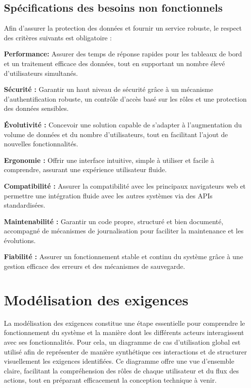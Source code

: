 \subsection{Spécifications des besoins non fonctionnels}

Afin d’assurer la protection des données et fournir un service robuste, le respect des critères suivants est obligatoire :

\noindent\textbf{Performance:} Assurer des temps de réponse rapides pour les tableaux de bord et un traitement efficace des données, tout en supportant un nombre élevé d’utilisateurs simultanés.
\vspace{0.3cm}

\noindent\textbf{Sécurité :} Garantir un haut niveau de sécurité grâce à un mécanisme d’authentification robuste, un contrôle d’accès basé sur les rôles et une protection des données sensibles.

\vspace{0.3cm}
\noindent\textbf{Évolutivité :} Concevoir une solution capable de s’adapter à l’augmentation du volume de données et du nombre d’utilisateurs, tout en facilitant l’ajout de nouvelles fonctionnalités.

\vspace{0.3cm}
\noindent\textbf{Ergonomie :} Offrir une interface intuitive, simple à utiliser et facile à comprendre, assurant une expérience utilisateur fluide.

\vspace{0.3cm}
\noindent\textbf{Compatibilité :} Assurer la compatibilité avec les principaux navigateurs web et permettre une intégration fluide avec les autres systèmes via des APIs standardisées.

\vspace{0.3cm}
\noindent\textbf{Maintenabilité :} Garantir un code propre, structuré et bien documenté, accompagné de mécanismes de journalisation pour faciliter la maintenance et les évolutions.

\vspace{0.3cm}
\noindent\textbf{Fiabilité :} Assurer un fonctionnement stable et continu du système grâce à une gestion efficace des erreurs et des mécanismes de sauvegarde.
\section{Modélisation des exigences}
\label{cap:Modélisation des exigences}
La modélisation des exigences constitue une étape essentielle pour comprendre le fonctionnement du système et la manière dont les différents acteurs interagissent avec ses fonctionnalités. Pour cela, un diagramme de cas d’utilisation global est utilisé afin de représenter de manière synthétique ces interactions et de structurer visuellement les exigences identifiées. Ce diagramme offre une vue d’ensemble claire, facilitant la compréhension des rôles de chaque utilisateur et du flux des actions, tout en préparant efficacement la conception technique à venir.


